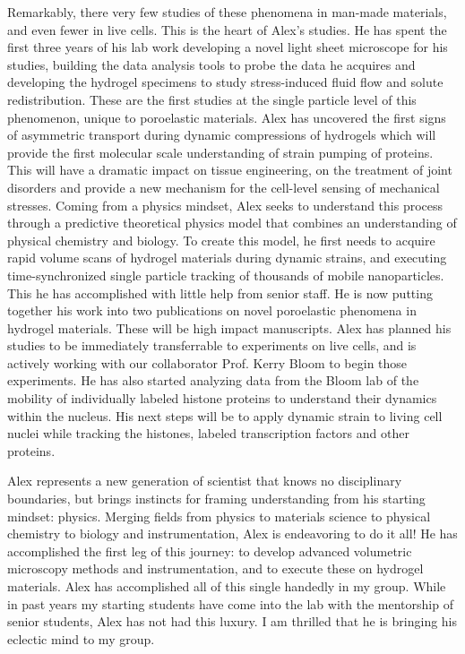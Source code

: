 \begin{indented}
Remarkably, there very few studies of these phenomena in man-made materials, and even fewer in live cells. This is the heart of Alex’s studies. He has spent the first three years of his lab work developing a novel light sheet microscope for his studies, building the data analysis tools to probe the data he acquires and developing the hydrogel specimens to study stress-induced fluid flow and solute redistribution. These are the first studies at the single particle level of this phenomenon, unique to poroelastic materials. Alex has uncovered the first signs of asymmetric transport during dynamic compressions of hydrogels which will provide the first molecular scale understanding of strain pumping of proteins. This will have a dramatic impact on tissue engineering, on the treatment of joint disorders and provide a new mechanism for the cell-level sensing of mechanical stresses. 
 Coming from a physics mindset, Alex seeks to understand this process through a predictive theoretical physics model that combines an understanding of physical chemistry and biology. To create this model, he first needs to acquire rapid volume scans of hydrogel materials during dynamic strains, and executing time-synchronized single particle tracking of thousands of mobile nanoparticles. This he has accomplished with little help from senior staff. He is now putting together his work into two publications on novel poroelastic phenomena in hydrogel materials. These will be high impact manuscripts. Alex has planned his studies to be immediately transferrable to experiments on live cells, and is actively working with our collaborator Prof. Kerry Bloom to begin those experiments. He has also started analyzing data from the Bloom lab of the mobility of individually labeled histone proteins to understand their dynamics within the nucleus.  His next steps will be to apply dynamic strain to living cell nuclei while tracking the histones, labeled transcription factors and other proteins. \par
Alex represents a new generation of scientist that knows no disciplinary boundaries, but brings instincts for framing understanding from his starting mindset: physics. Merging fields from physics to materials science to physical chemistry to biology and instrumentation, Alex is endeavoring to do it all! He has accomplished the first leg of this journey: to develop advanced volumetric microscopy methods and instrumentation, and to execute these on hydrogel materials. Alex has accomplished all of this single handedly in my group. While in past years my starting students have come into the lab with the mentorship of senior students, Alex has not had this luxury. I am thrilled that he is bringing his eclectic mind to my group.\par

\end{indented}
